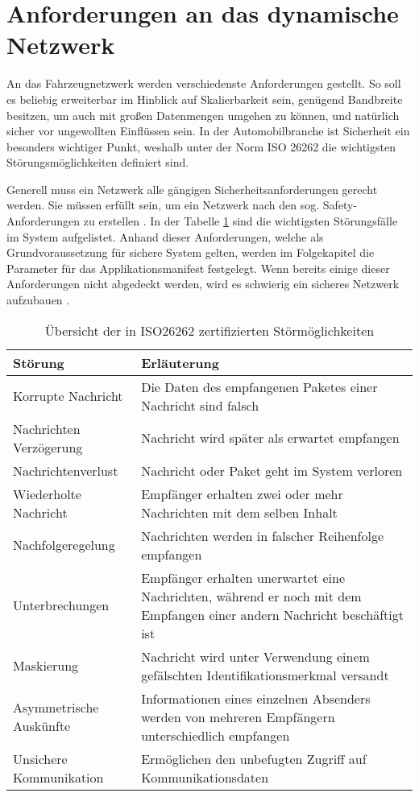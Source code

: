 \section{Anforderungen an das dynamische Netzwerk}\label{sec:NeuesNetz}
An das Fahrzeugnetzwerk werden verschiedenste Anforderungen gestellt. So soll es beliebig erweiterbar im Hinblick auf Skalierbarkeit sein, genügend Bandbreite besitzen, um auch mit großen Datenmengen umgehen zu können, und natürlich sicher vor ungewollten Einflüssen sein. In der Automobilbranche ist Sicherheit ein besonders wichtiger Punkt, weshalb unter der Norm ISO 26262 \cite{ISO26262} die wichtigsten Störungsmöglichkeiten definiert sind.

Generell muss ein Netzwerk alle gängigen Sicherheitsanforderungen gerecht werden. Sie müssen erfüllt sein, um ein Netzwerk nach den sog. Safety-Anforderungen zu erstellen \cite{Safety-critical}. In der Tabelle \ref{tab:Failure} sind die wichtigsten Störungsfälle im System aufgelistet. Anhand dieser Anforderungen, welche als Grundvoraussetzung für sichere System gelten, werden im Folgekapitel die Parameter für das Applikationsmanifest festgelegt. Wenn bereits einige dieser Anforderungen nicht abgedeckt werden, wird es schwierig ein sicheres Netzwerk aufzubauen \cite{FunctionalSafety}.
\begin{table}[!htb]
	\centering
	\begin{tabularx}{0.99\textwidth}{p{} | p{}}
		Störung & Erläuterung \\
		\hline\hline
		Korrupte Nachricht & Die Daten des empfangenen Paketes einer Nachricht sind falsch \\
		Nachrichten Verzögerung & Nachricht wird später als erwartet empfangen \\
		Nachrichtenverlust & Nachricht oder Paket geht im System verloren \\
		Wiederholte Nachricht & Empfänger erhalten zwei oder mehr Nachrichten mit dem selben Inhalt \\
		Nachfolgeregelung & Nachrichten werden in falscher Reihenfolge empfangen \\
		Unterbrechungen & Empfänger erhalten unerwartet eine Nachrichten, während er noch mit dem Empfangen einer andern Nachricht \newline beschäftigt ist\\
		Maskierung & Nachricht wird unter Verwendung einem gefälschten Identifikationsmerkmal versandt \\
		Asymmetrische \newline Auskünfte & Informationen eines einzelnen Absenders werden von mehreren Empfängern unterschiedlich empfangen \\
		Unsichere \newline Kommunikation & Ermöglichen den unbefugten Zugriff auf \newline Kommunikationsdaten \\
	\end{tabularx}
	\caption[Übersicht der in ISO26262 zertifizierten Störmöglichkeiten]{Übersicht der in ISO26262 zertifizierten Störmöglichkeiten}
	\label{tab:Failure}
\end{table}
